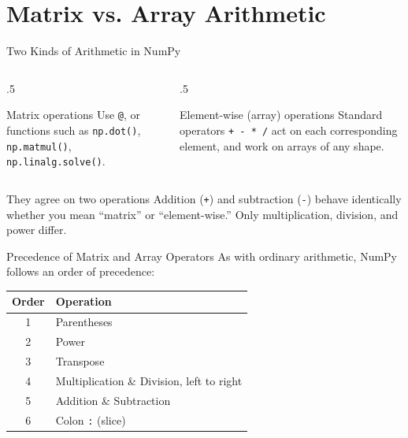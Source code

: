 \documentclass[9pt,aspectratio=169,xcolor=table]{beamer}
\begin{document}
\section{Matrix vs. Array Arithmetic}

\begin{frame}{Two Kinds of Arithmetic in NumPy}
    \leavevmode
    \begin{columns}[t]
        \begin{column}{.5\textwidth}
            \begin{block}{Matrix operations}
                \small Use \texttt{@}, or functions such as
                \texttt{np.dot()}, \texttt{np.matmul()},
                \texttt{np.linalg.solve()}.
            \end{block}
        \end{column}
        \begin{column}{.5\textwidth}
            \begin{block}{Element-wise (array) operations}
                \small Standard operators \texttt{+ - * /} act on each
                corresponding element, and work on arrays of any shape.
            \end{block}
        \end{column}
    \end{columns}

    \vspace{3mm}
    \begin{alertblock}{They agree on two operations}
        Addition (\texttt{+}) and subtraction (\texttt{-}) behave
        \alert{identically} whether you mean ``matrix'' or
        ``element-wise.'' Only multiplication, division, and power
        differ.
    \end{alertblock}
\end{frame}

\begin{frame}{Precedence of Matrix and Array Operators}
    \leavevmode
    As with ordinary arithmetic, NumPy follows an order of precedence:

    \begin{center}
    \small
    \begin{tabular}{cl}
        \toprule
        \textbf{Order} & \textbf{Operation} \\
        \midrule
        1 & Parentheses \\
        2 & Power \\
        3 & Transpose \\
        4 & Multiplication \& Division, left to right \\
        5 & Addition \& Subtraction \\
        6 & Colon \texttt{:} (slice) \\
        \bottomrule
    \end{tabular}
    \end{center}
\end{frame}
\end{document}
